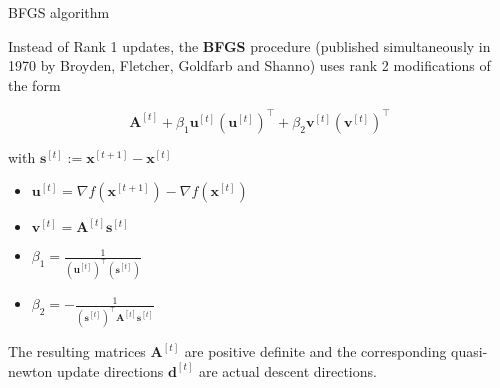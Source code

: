 \documentclass[11pt,compress,t,notes=noshow, xcolor=table]{beamer}
\begin{document}
\begin{vbframe}{BFGS algorithm}

Instead of Rank 1 updates, the \textbf{BFGS} procedure (published simultaneously in 1970 by Broyden, Fletcher, Goldfarb and Shanno) uses rank 2 modifications of the form

$$
\bm{A}^{[t]} + \beta_1 \bm{u}^{[t]}(\bm{u}^{[t]})^{\top} + \beta_2 \bm{v}^{[t]}(\bm{v}^{[t]})^{\top}
$$

with $\bm{s}^{[t]} := \bm{x}^{[t+1]} - \bm{x}^{[t]}$

\begin{itemize}
  \item $\bm{u}^{[t]} = \nabla f(\bm{x}^{[t+1]}) - \nabla f(\bm{x}^{[t]})$
  \item $\bm{v}^{[t]} = \bm{A}^{[t]} \bm{s}^{[t]}$
  \item $\beta_1 = \frac{1}{(\bm{u}^{[t]})^\top (\bm{s}^{[t]})}$
  \item $\beta_2 = - \frac{1}{(\bm{s}^{[t]})^\top \bm{A}^{[t]} \bm{s}^{[t]}}$
\end{itemize}

The resulting matrices $\bm{A}^{[t]}$ are positive definite and the corresponding quasi-newton update directions $\bm{d}^{[t]}$ are actual descent directions.



\end{vbframe}


\endlecture
\end{document}

